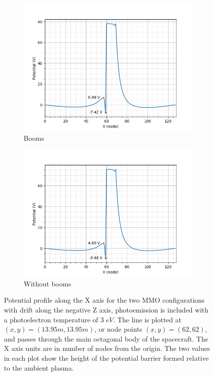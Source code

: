 \begin{figure}[H]
  \begin{subfigure}[b]{0.6\textwidth}
  \includegraphics[width=\textwidth]{figures/MMO/PHTemp/WB/L_PHTemp_WB.png}
  \caption{Booms}
  \label{fig:L_PHTemp_WB}
\end{subfigure}
\begin{subfigure}[b]{0.6\textwidth}
  \includegraphics[width=\textwidth]{figures/MMO/PHTemp/NB/L_PHTemp_NB.png}
  \caption{Without booms}
  \label{fig:L_PHTemp_NB}
\end{subfigure}
\label{fig:Line_PHTemp}
\caption{Potential profile along the X axis for the two MMO configurations with drift along the negative Z axis, photoemission is included with a photoelectron temperature of $3 \; eV$. The line is plotted at $(x,y) = (13.95 m, 13.95 m)$, or node points $(x,y) = (62,62)$, and passes through the main octagonal body of the spacecraft. The X axis units are in number of nodes from the origin. The two values in each plot show the height of the potential barrier formed relative to the ambient plasma.}
\end{figure}

